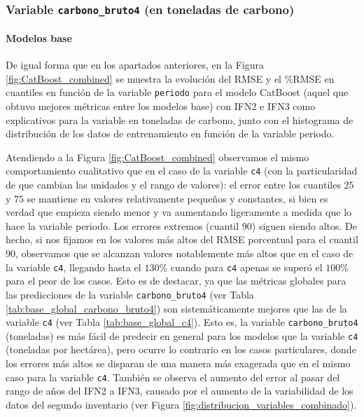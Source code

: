 \subsubsection{Variable \texttt{carbono\_bruto4} (en toneladas de carbono)}
\vspace{0.3cm}
\paragraph{Modelos base}

De igual forma que en los apartados anteriores, en la Figura \ref{fig:CatBoost_combined} se muestra la evolución del RMSE y el \%RMSE en cuantiles en función de la variable \texttt{periodo} para el modelo CatBoost (aquel que obtuvo mejores métricas entre los modelos base) con IFN2 e IFN3 como explicativos para la variable en toneladas de carbono, junto con el histograma de distribución de los datos de entrenamiento en función de la variable periodo.


Atendiendo a la Figura \ref{fig:CatBoost_combined} observamos el mismo comportamiento cualitativo que en el caso de la variable \texttt{c4} (con la particularidad de que cambian las unidades y el rango de valores): el error entre los cuantiles $25$ y $75$ se mantiene en valores relativamente pequeños y constantes, si bien es verdad que empieza siendo menor y va aumentando ligeramente a medida que lo hace la variable periodo. Los errores extremos (cuantil $90$) siguen siendo altos. De hecho, si nos fijamos en los valores más altos del RMSE porcentual para el cuantil $90$, observamos que se alcanzan valores notablemente más altos que en el caso de la variable \texttt{c4}, llegando hasta el $130\%$ cuando para \texttt{c4} apenas se superó el $100\%$ para el peor de los casos. Esto es de destacar, ya que las métricas globales para las predicciones de la variable \texttt{carbono\_bruto4} (ver Tabla \ref{tab:base_global_carbono_bruto4}) son sistemáticamente mejores que las de la variable \texttt{c4} (ver Tabla \ref{tab:base_global_c4}). Esto es, la variable \texttt{carbono\_bruto4} (toneladas) es más fácil de predecir en general para los modelos que la variable \texttt{c4} (toneladas por hectárea), pero ocurre lo contrario en los casos particulares, donde los errores más altos se disparan de una manera más exagerada que en el mismo caso para la variable \texttt{c4}. También se observa el aumento del error al pasar del rango de años del IFN2 a IFN3, causado por el aumento de la variabilidad de los datos del segundo inventario (ver Figura \ref{fig:distribucion_variables_combinado}). 

